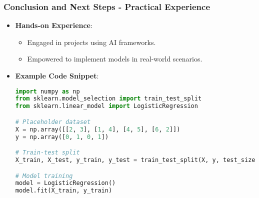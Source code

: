 \documentclass[aspectratio=169]{beamer}
\begin{document}
\begin{frame}[fragile]
    \frametitle{Conclusion and Next Steps - Practical Experience}

    \begin{itemize}
        \item \textbf{Hands-on Experience}:
        \begin{itemize}
            \item Engaged in projects using AI frameworks.
            \item Empowered to implement models in real-world scenarios.
        \end{itemize}
        
        \item \textbf{Example Code Snippet}:
        \begin{lstlisting}[language=Python]
import numpy as np
from sklearn.model_selection import train_test_split
from sklearn.linear_model import LogisticRegression

# Placeholder dataset
X = np.array([[2, 3], [1, 4], [4, 5], [6, 2]])
y = np.array([0, 1, 0, 1])

# Train-test split
X_train, X_test, y_train, y_test = train_test_split(X, y, test_size=0.3)

# Model training
model = LogisticRegression()
model.fit(X_train, y_train)
        \end{lstlisting}
    \end{itemize}
\end{frame}
\end{document}
